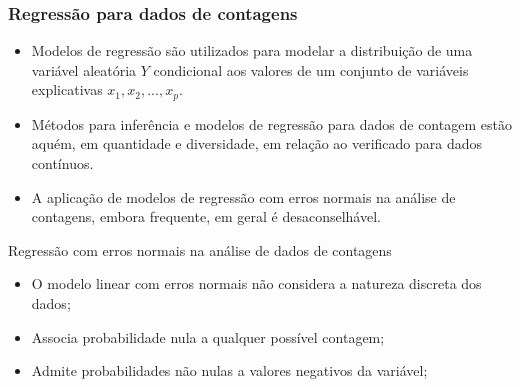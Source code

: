 \documentclass[10pt, aspectratio=169]{beamer}\usepackage[]{graphicx}\usepackage[]{color}
\begin{document}
\begin{frame}\frametitle{Regressão para dados de contagens}

\begin{itemize}

\item Modelos de regressão são utilizados para modelar a distribuição 
de uma variável aleatória $Y$ condicional aos valores de um conjunto 
de variáveis explicativas $x_{1},x_{2},...,x_{p}$.

\vspace{0,5cm}

\item Métodos para inferência e modelos de regressão para dados de 
contagem estão aquém, em quantidade e diversidade, em relação ao 
verificado para dados contínuos.

\vspace{0,5cm}

\item A aplicação de modelos de regressão com erros normais na análise 
de contagens, embora frequente, em geral é desaconselhável.

\end{itemize}
\end{frame}

\begin{frame}{Regressão com erros normais na análise de dados de contagens}
    \vspace{0,5cm}

    \begin{itemize}
        \item O modelo linear com erros normais não considera a 
        natureza discreta dos dados;
        \vspace{0,5cm}
        \item Associa probabilidade nula a qualquer possível contagem;
        \vspace{0,5cm}
        \item Admite probabilidades não nulas a valores negativos 
        da variável;
    \end{itemize}

\end{frame}
\end{document}
